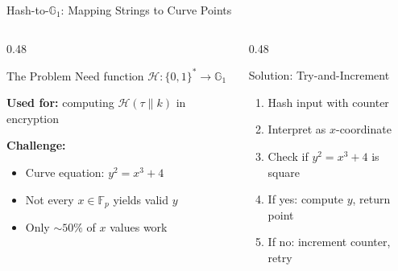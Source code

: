 \documentclass[aspectratio=169,10pt]{beamer}
\newcommand{\G}{\mathbb{G}}
\newcommand{\F}{\mathbb{F}}
\newcommand{\Hash}{\mathcal{H}}
\begin{document}
\begin{frame}{Hash-to-$\G_1$: Mapping Strings to Curve Points}
    \begin{columns}[T]
        \begin{column}{0.48\textwidth}
            \begin{block}{The Problem}
                Need function $\Hash: \{0,1\}^* \to \G_1$

                \vspace{0.2em}
                \textbf{Used for:} computing $\Hash(\tau \| k)$ in encryption
            \end{block}

            \vspace{0.3em}
            \textbf{Challenge:}
            \begin{itemize}
                \item Curve equation: $y^2 = x^3 + 4$
                \item Not every $x \in \F_p$ yields valid $y$
                \item Only $\sim 50\%$ of $x$ values work
            \end{itemize}

            \vspace{0.3em}
        \end{column}
        \begin{column}{0.48\textwidth}
            \begin{block}{Solution: Try-and-Increment}
                \begin{enumerate}
                    \item Hash input with counter
                    \item Interpret as $x$-coordinate
                    \item Check if $y^2 = x^3 + 4$ is square
                    \item If yes: compute $y$, return point
                    \item If no: increment counter, retry
                \end{enumerate}
            \end{block}


\end{column}
\end{columns}
\end{frame}
\end{document}
